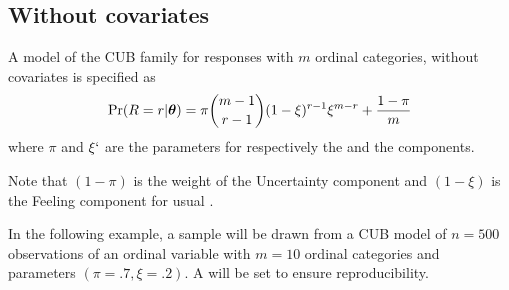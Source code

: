 \documentclass[letterpaper,10pt,english]{sphinxmanual}
\begin{document}
\subsection{Without covariates}
\label{\detokenize{manual:without-covariates}}\label{\detokenize{manual:cub-models-without-covariates}}
\sphinxAtStartPar
{}

\sphinxAtStartPar
A model of the CUB family for responses with \(m\) ordinal categories, without covariates is specified as
\begin{equation*}
\begin{split}\Pr(R=r|\boldsymbol{\theta}) = \pi \dbinom{m-1}{r-1}(1-\xi)^{r-1}\xi^{m-r}+\dfrac{1-\pi}{m}\end{split}
\end{equation*}
\sphinxAtStartPar
where \(\pi\) and \(\xi`\) are the parameters for respectively the  and the
 components.

\sphinxAtStartPar
Note that \((1-\pi)\) is the weight of the Uncertainty component and
\((1-\xi)\) is the Feeling component for usual .

\sphinxAtStartPar
In the following example, a sample will be drawn from a CUB model of \(n=500\) observations of an ordinal
variable with \(m=10\) ordinal categories
and parameters \((\pi=.7, \xi=.2)\). A  will be set to ensure reproducibility.
\def\sphinxLiteralBlockLabel{\label{\detokenize{manual:id275}}}
\begin{sphinxVerbatim}[commandchars=\\\{\},numbers=left,firstnumber=1,stepnumber=1]
   
   

  
      
     
\end{sphinxVerbatim}
\end{document}
